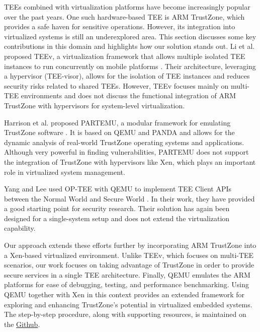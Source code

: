 \documentclass[acmtog]{acmart}
\begin{document}
TEEs combined with virtualization platforms have become increasingly popular over the past years. One such hardware-based TEE is ARM TrustZone, which provides a safe haven for sensitive operations. However, its integration into virtualized systems is still an underexplored area. This section discusses some key contributions in this domain and highlights how our solution stands out.
Li et al. proposed TEEv, a virtualization framework that allows multiple isolated TEE instances to run concurrently on mobile platforms \cite{10.1145/3313808.3313810}. Their architecture, leveraging a hypervisor (TEE-visor), allows for the isolation of TEE instances and reduces security risks related to shared TEEs. However, TEEv focuses mainly on multi-TEE environments and does not discuss the functional integration of ARM TrustZone with hypervisors for system-level virtualization.\cite{7005255} \cite{10.1007/978-3-642-32298-3_1}

Harrison et al. proposed PARTEMU, a modular framework for emulating TrustZone software \cite{247658}. It is based on QEMU and PANDA and allows for the dynamic analysis of real-world TrustZone operating systems and applications. Although very powerful in finding vulnerabilities, PARTEMU does not support the integration of TrustZone with hypervisors like Xen, which plays an important role in virtualized system management.

Yang and Lee used OP-TEE with QEMU to implement TEE Client APIs between the Normal World and Secure World \cite{10.1145/3426020.3426113}. In their work, they have provided a good starting point for security research. Their solution has again been designed for a single-system setup and does not extend the virtualization capability.\cite{10274941} \cite{10.1145/3426020.3426113} \cite{8352425}

Our approach extends these efforts further by incorporating ARM TrustZone into a Xen-based virtualized environment. Unlike TEEv, which focuses on multi-TEE scenarios, our work focuses on taking advantage of TrustZone in order to provide secure services in a single TEE architecture. Finally, QEMU emulates the ARM platforms for ease of debugging, testing, and performance benchmarking. Using QEMU together with Xen in this context provides an extended framework for exploring and enhancing TrustZone's potential in virtualized embedded systems. The step-by-step procedure, along with supporting resources, is maintained on the \href{https://github.com/li-yong/Xen-OPTEE-Hypervisor}{Github}. 
\end{document}
